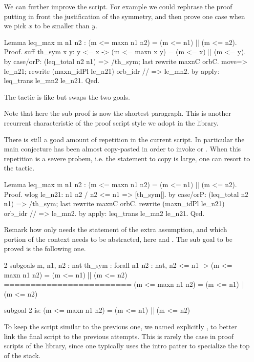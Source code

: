 We can further improve the script.  For example we could rephrase 
the proof putting in front the justification of the symmetry, and
then prove one case when we pick $x$ to be smaller than $y$.

\begin{coq}{}{}
Lemma leq_max m n1 n2 : (m <= maxn n1 n2) = (m <= n1) || (m <= n2).
Proof.
suff th_sym x y: y <= x -> (m <= maxn x y) = (m <= x) || (m <= y).
  by case/orP: (leq_total n2 n1) => /th_sym; last rewrite maxnC orbC.
move=> le_n21; rewrite (maxn_idPl le_n21) orb_idr // => le_mn2.
by apply: leq_trans le_mn2 le_n21.
Qed.
\end{coq}
The  tactic is like  but swaps the two goals.  

Note that here the sub proof is now the shortest paragraph.  
This is another recurrent characteristic of the proof script style
we adopt in the \mcbMC{} library.

There is still a good amount of repetition in the current script.
In particular the main conjecture has been almost copy-pasted in
order to invoke  or .  When this repetition
is a severe probem, i.e. the statement to copy is large, one
can resort to the  tactic.

\begin{coq}{}{}
Lemma leq_max m n1 n2 : (m <= maxn n1 n2) = (m <= n1) || (m <= n2).
Proof.
wlog le_n21: n1 n2 / n2 <= n1  => [th_sym|].
  by case/orP: (leq_total n2 n1) => /th_sym; last rewrite maxnC orbC.
rewrite (maxn_idPl le_n21) orb_idr // => le_mn2.
by apply: leq_trans le_mn2 le_n21.
Qed.
\end{coq}

Remark how  only needs the statement of the extra assumption,
and which portion of the context needs to be abstracted, here  and
.  The sub goal to be proved is the following one.

\begin{coqout}{}{}
2 subgoals
m, n1, n2 : nat
th_sym : forall n1 n2 : nat, n2 <= n1 ->
           (m <= maxn n1 n2) = (m <= n1) || (m <= n2)
========================
(m <= maxn n1 n2) = (m <= n1) || (m <= n2)


subgoal 2 is:
(m <= maxn n1 n2) = (m <= n1) || (m <= n2)
\end{coqout}

To keep the script similar to the previous one, we named explicitly
, to better link the final script to the previous attempts.
This is rarely the case in proof scripts of the library, since one typically
uses the  intro patter to specialize the top of the stack.

